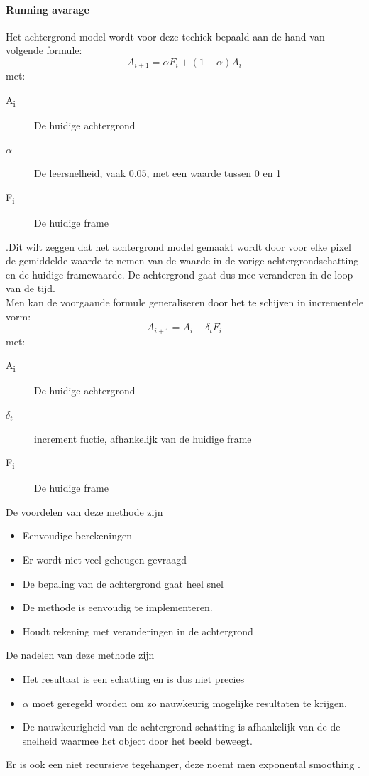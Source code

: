 \paragraph{Running avarage}
\label{refRUA}
Het achtergrond model wordt voor deze techiek bepaald aan de hand van volgende formule:
\begin{displaymath}
A_{i+1}=\alpha F_i+(1-\alpha)A_i
\end{displaymath}
met:
\begin{description}
	\item[A\textsubscript{i}] De huidige achtergrond
	\item[$\alpha$] De leersnelheid, vaak 0.05, met een waarde tussen 0 en 1
	\item[F\textsubscript{i}] De huidige frame
\end{description}
\cite{bibBEt}.Dit wilt zeggen dat het achtergrond model gemaakt wordt door voor elke pixel de gemiddelde waarde te nemen van de waarde in de vorige achtergrondschatting en de huidige framewaarde. De achtergrond gaat dus mee veranderen in de loop van de tijd. \\
Men kan de voorgaande formule generaliseren door het te schijven in incrementele vorm:
\begin{displaymath}
A_{i+1}=A_i+\delta_t F_i
\end{displaymath}
met:
\begin{description}
	\item[A\textsubscript{i}] De huidige achtergrond
	\item[$\delta_t$] increment fuctie, afhankelijk van de huidige frame
	\item[F\textsubscript{i}] De huidige frame
\end{description}
\cite{bibSDB}

De voordelen van deze methode zijn
\begin{itemize}
	\item Eenvoudige berekeningen
	\item Er wordt niet veel geheugen gevraagd
	\item De bepaling van de achtergrond gaat heel snel
	\item De methode is eenvoudig te implementeren.
	\item Houdt rekening met veranderingen in de achtergrond
\end{itemize}
De nadelen van deze methode zijn
\begin{itemize}
	\item Het resultaat is een schatting en is dus niet precies
	\item $\alpha$ moet geregeld worden om zo nauwkeurig mogelijke resultaten te krijgen.
	\item De nauwkeurigheid van de achtergrond schatting is afhankelijk van de de snelheid waarmee het object door het beeld beweegt.
\end{itemize}
Er is ook een niet recursieve tegehanger, deze noemt men exponental smoothing \cite{bibSDB}.

